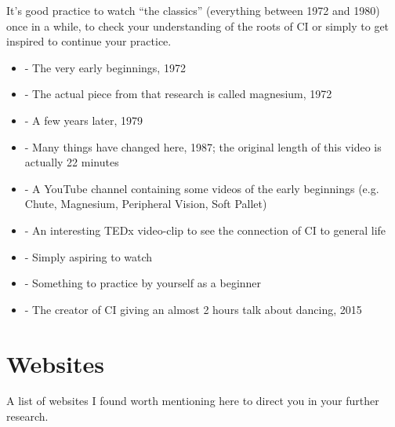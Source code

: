 It's good practice to watch ``the classics'' (everything between 1972 and 1980) once in a while, to check your understanding of the roots of CI or simply to get inspired to continue your practice.

\begin{itemize}
    \setlength\itemsep{0em}
    \item {} - The very early beginnings, 1972
    \item {} - The actual piece from that research is called magnesium, 1972
    \item {} - A few years later, 1979
    \item {} - Many things have changed here, 1987; the original length of this video is actually 22 minutes
    \item {} - A YouTube channel containing some videos of the early beginnings (e.g. Chute, Magnesium, Peripheral Vision, Soft Pallet)
    \item {} - An interesting TEDx video-clip to see the connection of CI to general life
    \item {} - Simply aspiring to watch
    \item {} - Something to practice by yourself as a beginner
    \item {} - The creator of CI giving an almost 2 hours talk about dancing, 2015
\end{itemize}

\section{Websites}\label{sec:websites}

A list of websites I found worth mentioning here to direct you in your further research.

